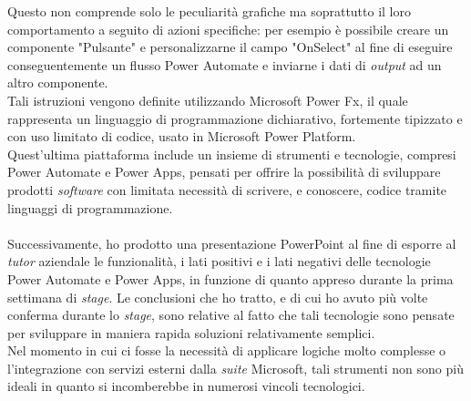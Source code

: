 Questo non comprende solo le peculiarità grafiche ma soprattutto il loro comportamento a seguito di azioni specifiche: per esempio è possibile creare un componente "Pulsante" e personalizzarne il campo "OnSelect" al fine di eseguire conseguentemente un flusso Power Automate e inviarne i dati di \emph{output} ad un altro componente.\\
Tali istruzioni vengono definite utilizzando Microsoft Power Fx, il quale rappresenta un linguaggio di programmazione dichiarativo, fortemente tipizzato e con uso limitato di codice, usato in Microsoft Power Platform.\\
Quest'ultima piattaforma include un insieme di strumenti e tecnologie, compresi Power Automate e Power Apps, pensati per offrire la possibilità di sviluppare prodotti \emph{software} con limitata necessità di scrivere, e conoscere, codice tramite linguaggi di programmazione.\\\\

Successivamente, ho prodotto una presentazione PowerPoint al fine di esporre al \emph{\emph{tutor}} aziendale le funzionalità, i lati positivi e i lati negativi delle tecnologie Power Automate e Power Apps, in funzione di quanto appreso durante la prima settimana di \emph{stage}.
Le conclusioni che ho tratto, e di cui ho avuto più volte conferma durante lo \emph{stage}, sono relative al fatto che tali tecnologie sono pensate per sviluppare in maniera rapida soluzioni relativamente semplici.\\
Nel momento in cui ci fosse la necessità di applicare logiche molto complesse o l'integrazione con servizi esterni dalla \emph{suite} Microsoft, tali strumenti non sono più ideali in quanto si incomberebbe in numerosi vincoli tecnologici.


